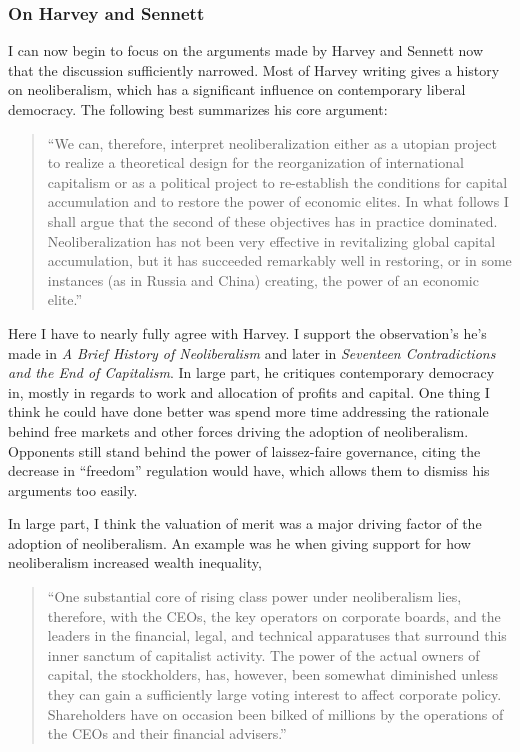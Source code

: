 \documentclass[12pt,a4paper]{article}
\begin{document}
\subsubsection{On Harvey and Sennett}
\vspace*{-8pt}
I can now begin to focus on the arguments made by Harvey and Sennett now that the discussion sufficiently narrowed. Most of Harvey writing gives a history on neoliberalism, which has a significant influence on contemporary liberal democracy. The following best summarizes his core argument:
\begin{quote}\color{G-Moon}
``We can, therefore, interpret neoliberalization either as a utopian project to realize a theoretical design for the reorganization of international capitalism or as a political project to re-establish the conditions for capital accumulation and to restore the power of economic elites. In what follows I shall argue that the second of these objectives has in practice dominated. Neoliberalization has not been very effective in  revitalizing global capital accumulation, but it has succeeded remarkably well in restoring, or in some instances (as in Russia and China) creating, the power of an economic elite.''~\cite{neo}
\end{quote}
Here I have to nearly fully agree with Harvey. I support the observation's he's made in \textit{A Brief History of Neoliberalism} and later in \textit{Seventeen Contradictions and the End of Capitalism}. In large part, he critiques contemporary democracy in, mostly in regards to work and allocation of profits and capital. One thing I think he could have done better was spend more time addressing the rationale behind free markets and other forces driving the adoption of neoliberalism. Opponents still stand behind the power of laissez-faire governance, citing the decrease in ``freedom'' regulation would have, which allows them to dismiss his arguments too easily.

In large part, I think the valuation of merit was a major driving factor of the adoption of neoliberalism. An example was he when giving support for how neoliberalism increased wealth inequality,
\begin{quote}\color{G-Moon}
   ``One substantial core of rising class power under 
neoliberalism lies, therefore, with the CEOs, the key 
operators on corporate boards, and the leaders in the 
financial, legal, and technical apparatuses that surround this 
inner sanctum of capitalist activity. The power of the actual 
owners of capital, the stockholders, has, however, been 
somewhat diminished unless they can gain a sufficiently 
large voting interest to affect corporate policy. Shareholders 
have on occasion been bilked of millions by the operations 
of the CEOs and their financial advisers.''~\cite{neo}
\end{quote}
\end{document}
